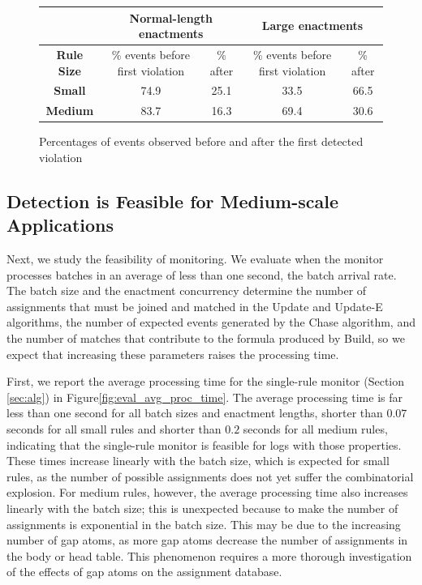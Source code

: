 \begin{figure}[ht]
  \vspace{-2mm}
  \centering
  \begin{footnotesize}
    \renewcommand{\arraystretch}{1.6}
  \begin{tabular}[t]{|c||c|c||c|c|}\cline{2-5}
   \multicolumn{1}{c}{}         & \multicolumn{2}{|c||}{\bf Normal-length enactments}          & \multicolumn{2}{|c|}{\bf Large enactments}  \\\hline
    {\bf Rule Size}   & \% events before first violation  & \% after & \% events before first violation  & \% after \\\hline
    {\bf Small}  & 74.9 & 25.1  & 33.5 & 66.5                 \\\hline
    {\bf Medium} & 83.7 & 16.3  & 69.4 & 30.6              \\\hline
  \end{tabular}
  \end{footnotesize}
  \caption{Percentages of events observed before and after the first detected violation}
  \vspace*{-2mm}
  \label{fig:eval_early_detection_benefits}
\end{figure}

\subsection{Detection is Feasible for Medium-scale Applications}
\label{subsec:log-properties}

Next,
we study the feasibility of monitoring.
We evaluate when the monitor
processes batches
in an average of less than one second,
the batch arrival rate.
The batch size and the enactment concurrency
determine the number of assignments
that must be joined and matched
in the {\sf Update} and {\sf Update-E} algorithms,
the number of expected events generated by the {\sf Chase} algorithm,
and the number of matches that contribute 
to the formula produced by {\sf Build},
so we expect that increasing these parameters raises the processing time.

First, we report the average processing time
for the single-rule monitor (Section \ref{sec:alg})
in Figure\:\ref{fig:eval_avg_proc_time}.
The average processing time is far less than one second
for all batch sizes and enactment lengths,
shorter than $0.07$ seconds for all small rules and 
shorter than $0.2$ seconds for all medium rules,
indicating that the single-rule monitor is feasible
for logs with those properties.
These times increase linearly with the batch size,
which is expected for small rules,
as the number of possible assignments
does not yet suffer the combinatorial explosion.
For medium rules, however,
the average processing time also increases linearly
with the batch size;
this is unexpected because
to make the number of assignments
is exponential in the batch size.
This may be due to the increasing number of gap atoms,
as more gap atoms decrease
the number of assignments in the body or head table.
This phenomenon requires a more thorough investigation
of the effects of gap atoms on the assignment database.

